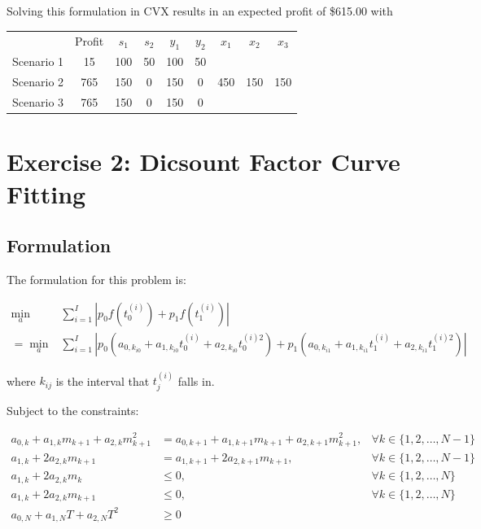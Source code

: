 \documentclass[a4paper]{article}
\begin{document}
Solving this formulation in CVX results in an expected profit of \$615.00 with

\begin{tabular}{c  c  c c  c c c c c}
           & Profit & $s_1$ & $s_2$ & $y_1$ & $y_2$ & $x_1$ & $x_2$ & $x_3$ \\
Scenario 1 &   15   & 100   & 50    & 100   & 50    &       &       &       \\
Scenario 2 &  765   & 150   & 0     & 150   & 0     & 450   & 150   & 150   \\
Scenario 3 &  765   & 150   & 0     & 150   & 0     &       &       &       \\
\end{tabular}

\section{Exercise 2: Dicsount Factor Curve Fitting }
\subsection{Formulation}
The formulation for this problem is:

\begin{equation}
\begin{aligned}
\min_a & \sum_{i=1}^I | p_0 f(t_0^{(i)}) +  p_1 f(t_1^{(i)}) |
\\ = \min_a & \sum_{i=1}^I | p_0 (a_{0,k_{i0}} + a_{1,k_{i0}} t_0^{(i)} + a_{2,k_{i0}} t_0^{(i) 2} )
+  p_1 (a_{0,k_{i1}} + a_{1,k_{i1}} t_1^{(i)} + a_{2,k_{i1}} t_1^{(i) 2} ) |
\end{aligned}
\end{equation}

where $k_{ij}$ is the interval that $t_j^{(i)}$ falls in.

Subject to the constraints:

\begin{equation}
  \begin{aligned}
    a_{0,k} + a_{1,k} m_{k+1} + a_{2,k} m_{k+1}^2
    &=
    a_{0,k+1} + a_{1,k+1} m_{k+1} + a_{2,k+1} m_{k+1}^2
    , &\forall k \in \{1,2,\dots,N-1\}
    \\
    a_{1,k} + 2 a_{2,k} m_{k+1}
    &=
    a_{1,k+1} + 2 a_{2,k+1} m_{k+1}
    , &\forall k \in \{1,2,\dots,N-1\}
    \\
    a_{1,k} + 2 a_{2,k} m_k     &\leq 0 , & \forall k \in \{1,2,\dots,N\}
    \\
    a_{1,k} + 2 a_{2,k} m_{k+1} &\leq 0 , & \forall k \in \{1,2,\dots,N\}
    \\
    a_{0,N} + a_{1,N} T + a_{2,N} T^2 &\geq 0 &
  \end{aligned}
\end{equation}
\end{document}
